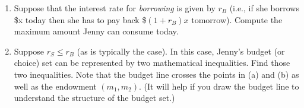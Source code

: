 \documentclass[11pt]{article}
\begin{document}
\begin{enumerate}
\begin{enumerate}
        \item Suppose that the interest rate for \emph{borrowing} is given by $r_{B}$ (i.e., if she borrows \$x today then she has to pay back \$$(1+r_{B})x$ tomorrow). Compute the maximum amount Jenny can consume today.

        \item Suppose $r_{S}\leq r_{B}$ (as is typically the case). In this case, Jenny's budget (or choice) set can be represented by two mathematical inequalities. Find those two inequalities. Note that the budget line crosses the points in (a) and (b) as well as the endowment $(m_{1},m_{2})$. (It will help if you draw the budget line to understand the structure of the budget set.)
    \end{enumerate}


\end{enumerate}
\end{document}
